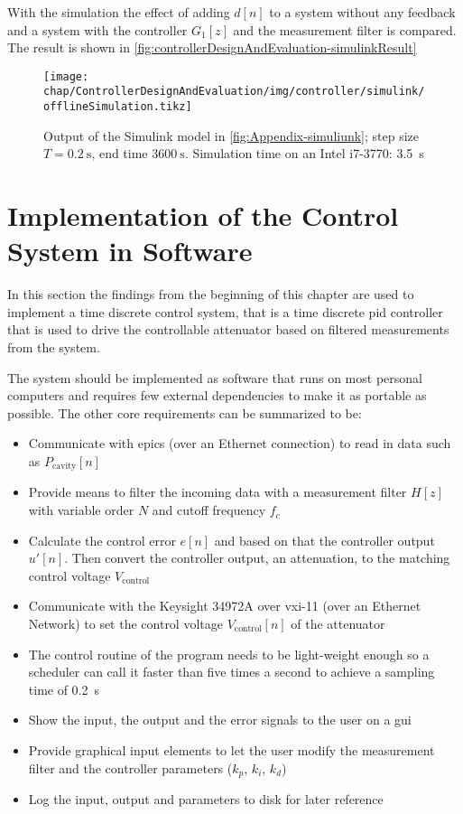 With the simulation the effect of adding $d[n]$ to a system without any feedback and a system with the controller $G_1[z]$ and the measurement filter is compared. The result is shown in \autoref{fig:controllerDesignAndEvaluation-simulinkResult}

\begin{figure}[tb]
	\centering
	\texttt{[image: chap/ControllerDesignAndEvaluation/img/controller/simulink/offlineSimulation.tikz]}
	\caption{Output of the Simulink model in \autoref{fig:Appendix-simuliunk}; step size $T=\SI{0.2}{\second}$, end time $\SI{3600}{\second}$. Simulation time on an Intel i7-3770: \SI{3.5}{\second}}
	\label{fig:controllerDesignAndEvaluation-simulinkResult}
\end{figure}







\newpage
\section{Implementation of the Control System in Software}
In this section the findings from the beginning of this chapter are used to implement a time discrete control system, that is a time discrete \gls{pid} controller that is used to drive the controllable attenuator based on filtered measurements from the system.

The system should be implemented as software that runs on most personal computers and requires few external dependencies to make it as portable as possible. The other core requirements can be summarized to be:
\begin{itemize}
\item Communicate with \gls{epics} (over an Ethernet connection) to read in data such as $P_\text{cavity}[n]$
\item Provide means to filter the incoming data with a measurement filter $H[z]$ with variable order $N$ and cutoff frequency $f_c$
\item Calculate the control error $e[n]$ and based on that the controller output $u'[n]$. Then convert the controller output, an attenuation, to the matching control voltage $V_\text{control}$
\item Communicate with the Keysight 34972A over \gls{vxi-11} (over an Ethernet Network) to set the control voltage $V_\text{control}[n]$ of the attenuator
\item The control routine of the program needs to be light-weight enough so a scheduler can call it faster than five times a second to achieve a sampling time of \SI{0.2}{\second}
\item Show the input, the output and the error signals to the user on a \gls{gui}
\item Provide graphical input elements to let the user modify the measurement filter and the controller parameters ($k_p$, $k_i$, $k_d$)
\item Log the input, output and parameters to disk for later reference
\end{itemize}

